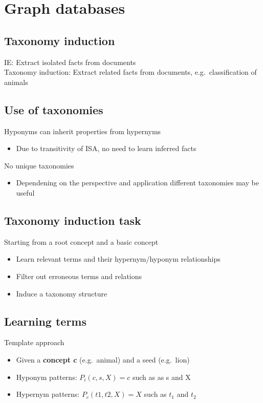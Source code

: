 \section{Graph databases}

\subsection{Taxonomy induction}
IE: Extract isolated facts from documents \\
Taxonomy induction: Extract related facts from documents, e.g.\
classification of animals

\subsection{Use of taxonomies}

Hyponyms can inherit properties from hypernyms
\begin{itemize}
\item Due to transitivity of ISA, no need to learn inferred facts
\end{itemize}
No unique taxonomies
\begin{itemize}
\item Dependening on the perspective and application different
  taxonomies may be useful
\end{itemize}

\subsection{Taxonomy induction task}
Starting from a root concept and a basic concept
\begin{itemize}
\item Learn relevant terms and their hypernym/hyponym relationships
\item Filter out erroneous terms and relations
\item Induce a taxonomy structure
\end{itemize}

\subsection{Learning terms}

Template approach
\begin{itemize}
\item Given a \textbf{concept c} (e.g.\ animal) and a seed (e.g.\
  lion)
\item Hyponym patterns: $ P_i(c, s, X) = c $ such as as s and X
\item Hypernym patterns: $ P_c(t1, t2, X) = X $ such as $ t_1 $ and $
  t_2 $
\end{itemize}

